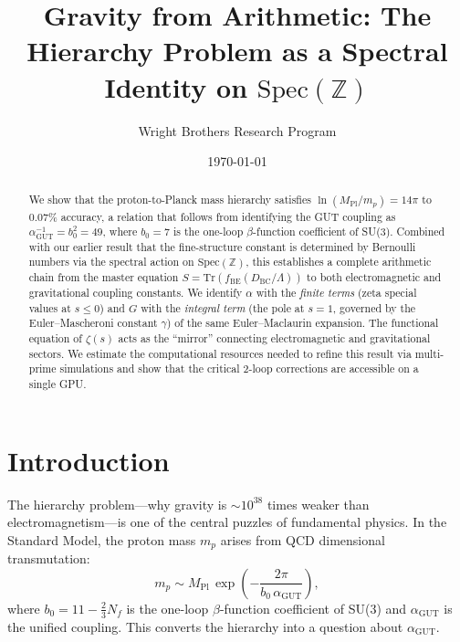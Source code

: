 \documentclass[aps,prl,twocolumn,superscriptaddress,nofootinbib]{revtex4-2}
\newcommand{\Spec}{\mathrm{Spec}}
\newcommand{\Tr}{\mathrm{Tr}}
\begin{document}
\title{Gravity from Arithmetic: The Hierarchy Problem as a Spectral Identity on $\Spec(\mathbb{Z})$}

\author{Wright Brothers Research Program}

\date{\today}

\begin{abstract}
We show that the proton-to-Planck mass hierarchy satisfies
$\ln(M_{\mathrm{Pl}}/m_p)=14\pi$ to $0.07\%$ accuracy, a relation
that follows from identifying the GUT coupling as
$\alpha_{\mathrm{GUT}}^{-1}=b_0^2=49$, where $b_0=7$ is the
one-loop $\beta$-function coefficient of SU(3).  Combined with our
earlier result that the fine-structure constant is determined by
Bernoulli numbers via the spectral action on $\Spec(\mathbb{Z})$,
this establishes a complete arithmetic chain from the master
equation $S=\Tr(f_{\mathrm{BE}}(D_{\mathrm{BC}}/\Lambda))$ to both
electromagnetic and gravitational coupling constants.  We identify
$\alpha$ with the \emph{finite terms} (zeta special values at
$s\leq 0$) and $G$ with the \emph{integral term} (the pole at
$s=1$, governed by the Euler--Mascheroni constant $\gamma$) of the
same Euler--Maclaurin expansion.  The functional equation of
$\zeta(s)$ acts as the ``mirror'' connecting electromagnetic and
gravitational sectors.  We estimate the computational resources
needed to refine this result via multi-prime simulations and show
that the critical 2-loop corrections are accessible on a single GPU.
\end{abstract}

\maketitle

\section{Introduction}

The hierarchy problem---why gravity is $\sim 10^{38}$ times weaker
than electromagnetism---is one of the central puzzles of fundamental
physics.  In the Standard Model, the proton mass $m_p$ arises from
QCD dimensional transmutation:
\begin{equation}\label{eq:dimtrans}
  m_p \sim M_{\mathrm{Pl}}\,\exp\!\left(-\frac{2\pi}{b_0\,\alpha_{\mathrm{GUT}}}\right),
\end{equation}
where $b_0=11-\frac{2}{3}N_f$ is the one-loop $\beta$-function
coefficient of SU(3) and $\alpha_{\mathrm{GUT}}$ is the unified
coupling.  This converts the hierarchy into a question about
$\alpha_{\mathrm{GUT}}$.
\end{document}
